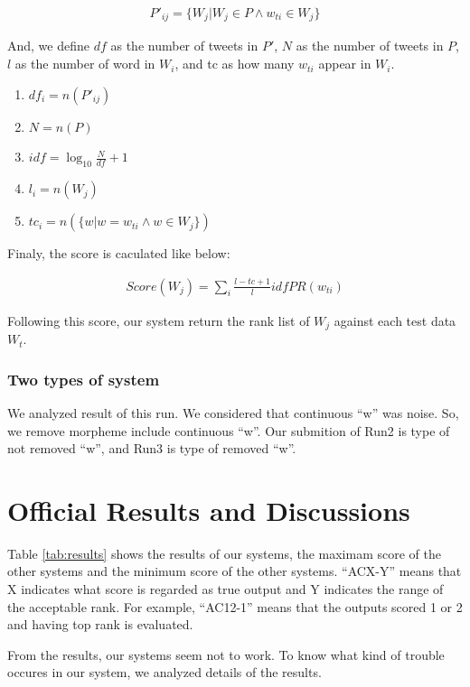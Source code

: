 \documentclass{../style/sig-alternate}
\begin{document}
\begin{eqnarray}P'_{ij} = \{W_{j} | W_{j} \in P \wedge w_{ti} \in W_{j}\}\end{eqnarray}

And, we define $df$ as the number of tweets in $P'$, $N$ as the number of tweets in $P$, $l$ as the number of word in $W_{i}$, and tc as how many $w_{ti}$ appear in $W_{i}$.

\begin{enumerate}
    \item $df_{i} = n(P'_{ij})$
    \item $N = n(P)$
    \item $idf = \log_{10} \frac{N}{df} + 1$
    \item $l_{i} = n(W_{j})$
    \item $tc_{i} = n(\{w | w = w_{ti} \wedge w \in W_{j}\})$
\end{enumerate}

Finaly, the score is caculated like below:

\begin{eqnarray}Score(W_{j}) = \sum_{i} \frac{l-tc+1}{l} idf PR(w_{ti})\end{eqnarray}

Following this score, our system return the rank list of $W_{j}$ against each test data $W_{t}$.

\subsubsection{Two types of system}

  We analyzed result of this run. We considered that continuous ``w'' was noise. So, we remove morpheme include continuous ``w''.
  Our submition of Run2 is type of not removed ``w'', and Run3 is type of removed ``w''.



\section{Official Results and Discussions}
\label{sec:results}
Table \ref{tab:results} shows the results of our systems, the maximam score of the other systems and the minimum score of the other systems. 
``ACX-Y'' means that X indicates what score is regarded as true output and Y indicates the range of the acceptable rank. For example, ``AC12-1'' means that the outputs scored 1 or 2 and having top rank is evaluated.

From the results, our systems seem not to work. To know what kind of trouble occures in our system, we analyzed details of the results.
\end{document}
